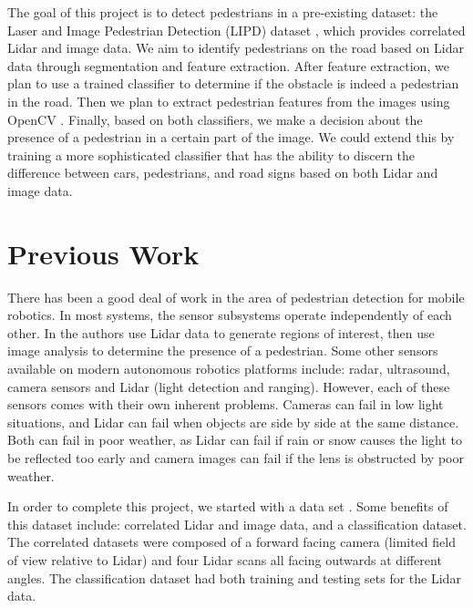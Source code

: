 \documentclass[10pt,twocolumn,letterpaper]{article}
\begin{document}
  The goal of this project is to detect pedestrians in a pre-existing dataset:
  the Laser and Image Pedestrian Detection (LIPD) dataset \cite{dataset}, 
  which provides correlated Lidar and image data. We aim to identify pedestrians 
  on the road based on Lidar data through segmentation and feature extraction.
  After feature extraction, we plan to use a trained classifier to determine
  if the obstacle is indeed a pedestrian in the road. Then we plan to extract 
  pedestrian features from the images using OpenCV \cite{opencv}. Finally, 
  based on both classifiers, we make a decision about the presence of a 
  pedestrian in a certain part of the image. We could extend this by
  training a more sophisticated classifier that has the ability to discern the
  difference between cars, pedestrians, and road signs based on both Lidar
  and image data.

\section{Previous Work}

  There has been a good deal of work in the area of pedestrian detection for
  mobile robotics. In most systems, the sensor subsystems operate independently
  of each other. In \cite{journal} the authors use Lidar data to generate regions
  of interest, then use image analysis to determine the presence of a
  pedestrian. Some other sensors available on modern autonomous robotics
  platforms include: radar, ultrasound, camera sensors and Lidar (light
  detection and ranging). However, each of these sensors comes with their own
  inherent problems. Cameras can fail in low light situations, and Lidar can
  fail when objects are side by side at the same distance. Both can fail in poor
  weather, as Lidar can fail if rain or snow causes the light to be reflected
  too early and camera images can fail if the lens is obstructed by poor weather.

  In order to complete this project, we started with a data set \cite{dataset}.
  Some benefits of this dataset include: correlated Lidar and image data, and
  a classification dataset. The correlated datasets were composed of a forward
  facing camera (limited field of view relative to Lidar) and four Lidar scans
  all facing outwards at different angles. The classification dataset had both
  training and testing sets for the Lidar data.


\end{document}
